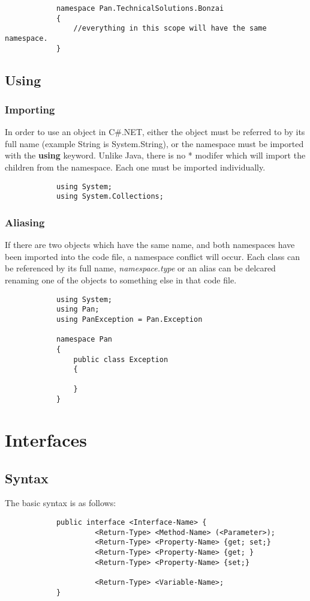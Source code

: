 \documentclass {amsart}
\begin{document}
		\begin{lstlisting}
			namespace Pan.TechnicalSolutions.Bonzai
			{
				//everything in this scope will have the same namespace.  
			}
		\end{lstlisting}

	\subsection {Using}
		\subsubsection {Importing}  In order to use an object in C\#.NET, either the object must be referred to by its full name (example String is System.String), or the namespace must be imported with the {\bf using} keyword.  Unlike Java, there is no * modifer which will import the children from the namespace.  Each one must be imported individually. 
		\begin{lstlisting}
			using System;
			using System.Collections;
		\end{lstlisting}

		\subsubsection {Aliasing} If there are two objects which have the same name, and both namespaces have been imported into the code file, a namespace conflict will occur.  Each class can be referenced by its full name, \emph{namespace.type} or an alias can be delcared renaming one of the objects to something else in that code file.  
		\begin{lstlisting}
			using System;
			using Pan;
			using PanException = Pan.Exception

			namespace Pan
			{
				public class Exception
				{
	
				}
			}
		\end{lstlisting}

\section{Interfaces}
	\subsection{Syntax} The basic syntax is as follows: 
		\begin{verbatim}
			public interface <Interface-Name> {
				     <Return-Type> <Method-Name> (<Parameter>);
				     <Return-Type> <Property-Name> {get; set;}
				     <Return-Type> <Property-Name> {get; }
				     <Return-Type> <Property-Name> {set;}

				     <Return-Type> <Variable-Name>;
			}
		\end{verbatim} 
\end{document}
